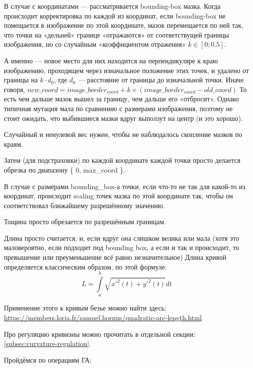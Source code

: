 В случае с координатами — рассматривается bounding-box мазка.
Когда происходит корректировка по каждой из координат, если bounding-box не помещается в изображение по этой координате,
мазок перемещается по ней так, что точки на «дельней» границе «отражаются» от соответствущей границы изображения, но
со случайным «коэффициентом отражения» $k \in [0; 0.5]$.

А именно — новое место для них находится на перпендикуляре к краю изображению,
проходящем через изначальное положение этих точек, и удалено от границы на $k \cdot d_0$, где $d_0$ — расстояние от границы до изначальной точки.
Иначе говоря, $new\_coord = image\_border_{coord} + k \times (image\_border_{coord} - old\_coord)$
То есть чем дальше мазок вышел за границу, чем дальше его «отбросит».
Однако типичная мутация мала по сравнению с размерами изображения, поэтому не стоит ожидать, что выбившиеся мазки вдруг выползут на центр (и это хорошо).

Случайный и ненулевой вес нужен, чтобы не наблюдалось скопление мазков по краям.

Затем (для подстраховки) по каждой координате каждой точки просто делается обрезка по диапазону \{ 0, max_coord \}.

В случае с размерами bounding\_box-а точки, если что-то не так для какой-то из координат, происходит scaling точек мазка по этой координате так,
чтобы он соответствовал ближайшему разрешённому значению.

Тощина просто обрезается по разрешённым границам.

Длина просто считается, и, если вдруг она слишком велика или мала
(хотя это маловероятно, если подходит под bounding box, а если и так и происходит, то превышение или преуменьшение всё равно незначительное)
Длина кривой определяется классическим образом, по этой формуле:
\begin{equation}\label{eq:curve_length}
    L = \int \limits_{a}^{b}{ \sqrt {{x'}^{2}(t) + {y'}^{2}(t)} } dt
\end{equation}

Применение этого к кривым безье можно найти здесь: \url{https://members.loria.fr/samuel.hornus/quadratic-arc-length.html}

Про регуляцию кривизны можно прочитать в отдельной секции: \ref{subsec:curvature-regulation}.

Пройдёмся по операциям ГА:

